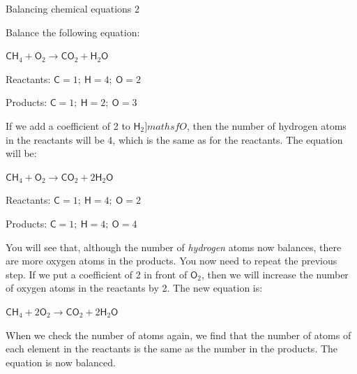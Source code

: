 \begin{wex}{Balancing chemical equations 2}{Balance the following equation:
\begin{center}
${\mathsf{CH}_{4} + \mathsf{O}_{2} \rightarrow \mathsf{CO}_{2} + \mathsf{H}_{2}\mathsf{O}}$
\end{center}
}

{

Reactants: $\mathsf{C} = 1;~ \mathsf{H} = 4;~ \mathsf{O} = 2$

Products: $\mathsf{C} = 1;~ \mathsf{H} = 2;~ \mathsf{O} = 3$
}

{

If we add a coefficient of 2 to $\mathsf{H}_{2}]mathsf{O}$, then the number of hydrogen atoms in the reactants will be 4, which is the same as for the reactants. The equation will be:

\begin{center}
${\mathsf{CH}_{4} + \mathsf{O}_{2} \rightarrow \mathsf{CO}_{2} + 2\mathsf{H}_{2}\mathsf{O}}$\\
\end{center}
}

{

Reactants: $\mathsf{C} = 1;~ \mathsf{H} = 4;~ \mathsf{O} = 2$

Products: $\mathsf{C} = 1;~ \mathsf{H} = 4; ~\mathsf{O} = 4$

You will see that, although the number of \textit{hydrogen} atoms now balances, there are more oxygen atoms in the products. You now need to repeat the previous step. If we put a coefficient of 2 in front of $\mathsf{O}_{2}$, then we will increase the number of oxygen atoms in the reactants by 2. The new equation is:

\begin{center}
${\mathsf{CH}_{4} + 2\mathsf{O}_{2} \rightarrow \mathsf{CO}_{2} + 2\mathsf{H}_{2}\mathsf{O}}$
\end{center}

When we check the number of atoms again, we find that the number of atoms of each element in the reactants is the same as the number in the products. The equation is now balanced.
}
\end{wex}
    \noindent
\label{m38726*secfhsst!!!underscore!!!id501}\vspace{.5cm} 
      \noindent
\par
            \label{m38726*secfhsst!!!underscore!!!id590}\vspace{.5cm} 
